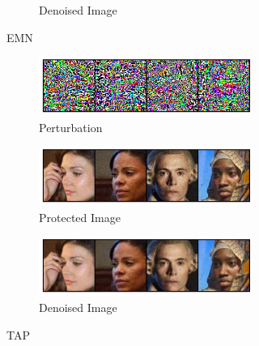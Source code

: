 \documentclass[conference]{IEEEtran}
\theoremstyle{definition}
\theoremstyle{remark}
\theoremstyle{proposition}
\begin{document}
\begin{figure}[p!]
\begin{subfigure}{1.0\textwidth}
\begin{subfigure}{.5\textwidth}
            \caption*{Denoised Image}
    	\end{subfigure}
	\caption{EMN~\citep{huang2021emn}}
    \end{subfigure}
    \begin{subfigure}{1.0\textwidth}
        \begin{center}
        	\begin{subfigure}{.5\textwidth}
        		\centering
        		\includegraphics[width=1.0\textwidth, valign=c]{webface/pert_tap16.jpg}
                \caption*{Perturbation}
        	\end{subfigure}
        \end{center}
    	\begin{subfigure}{.5\textwidth}
    		\centering
    		\includegraphics[width=1.0\textwidth, valign=c]{webface/pois_tap16.jpg}
            \caption*{Protected Image}
    	\end{subfigure}
    	\begin{subfigure}{.5\textwidth}
    		\centering
    		\includegraphics[width=1.0\textwidth, valign=c]{webface/san_tap16.jpg}
            \caption*{Denoised Image}
    	\end{subfigure}
	\caption{TAP~\citep{fowl2021tap}}
    \end{subfigure}
    \begin{subfigure}{1.0\textwidth}
        \begin{center}

\end{center}
\end{subfigure}
\end{figure}
\end{document}
